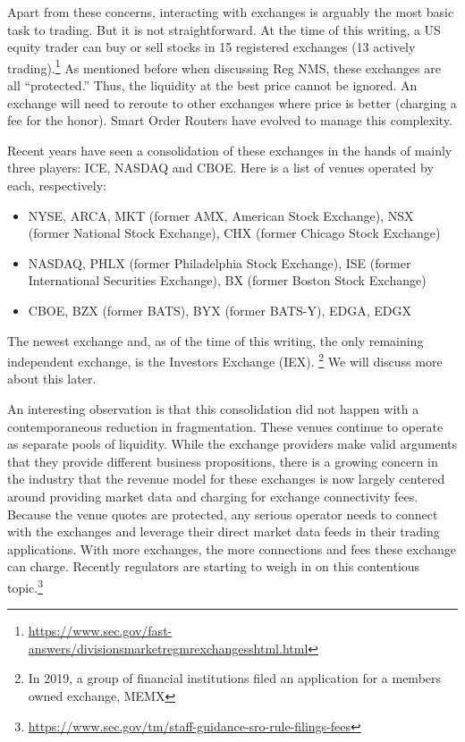 Apart from these concerns, interacting with exchanges is arguably the most basic task to trading. But it is not straightforward. At the time of this writing, a US equity trader can buy or sell stocks in 15 registered exchanges (13 actively trading).\footnote{\url{https://www.sec.gov/fast-answers/divisionsmarketregmrexchangesshtml.html}} As mentioned before when discussing Reg NMS, these exchanges are all ``protected.'' Thus, the liquidity at the best price cannot be ignored. An exchange will need to reroute to other exchanges where price is better (charging a fee for the honor). Smart Order Routers have evolved to manage this complexity.


Recent years have seen a consolidation of these exchanges in the hands of mainly three players: ICE, NASDAQ and CBOE. Here is a list of venues operated by each, respectively:
        \begin{itemize}
        \item NYSE, ARCA, MKT (former AMX, American Stock Exchange), NSX (former National Stock Exchange), CHX (former Chicago Stock Exchange)
        \item NASDAQ, PHLX (former Philadelphia Stock Exchange), ISE (former International Securities Exchange), BX (former Boston Stock Exchange)
        \item CBOE, BZX (former BATS), BYX (former BATS-Y), EDGA, EDGX
        \end{itemize}
The newest exchange and, as of the time of this writing, the only remaining independent exchange, is the Investors Exchange (IEX). \footnote{In 2019, a group of financial institutions filed an application for a members owned exchange, MEMX} We will discuss more about this later.


An interesting observation is that this consolidation did not happen with a contemporaneous reduction in fragmentation. These venues continue to operate as separate pools of liquidity. While the exchange providers make valid arguments that they provide different business propositions, there is a growing concern in the industry that the revenue model for these exchanges is now largely centered around providing market data and charging for exchange connectivity fees. Because the venue quotes are protected, any serious operator needs to connect with the exchanges and leverage their direct market data feeds in their trading applications. With more exchanges, the more connections and fees these exchange can charge. Recently regulators are starting to weigh in on this contentious topic.\footnote{\url{https://www.sec.gov/tm/staff-guidance-sro-rule-filings-fees}}


